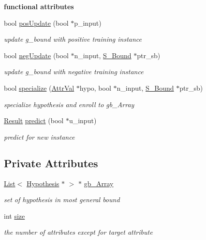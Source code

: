 \begin{Indent}{\bf functional attributes}\par
\begin{DoxyCompactItemize}
\item 
bool \hyperlink{class_g___bound_ad44aeb38feed0ff7e9a2f29f2ada0ac9}{pos\-Update} (bool $\ast$p\-\_\-input)
\begin{DoxyCompactList}\small\item\em update g\-\_\-bound with positive training instance \end{DoxyCompactList}\item 
bool \hyperlink{class_g___bound_a567a0759047141b59389ec0beefb0a6c}{neg\-Update} (bool $\ast$n\-\_\-input, \hyperlink{class_s___bound}{S\-\_\-\-Bound} $\ast$ptr\-\_\-sb)
\begin{DoxyCompactList}\small\item\em update g\-\_\-bound with negative training instance \end{DoxyCompactList}\item 
bool \hyperlink{class_g___bound_acd21b1bb8bd73218d5000bf1fd12872e}{specialize} (\hyperlink{concept_8h_a9680d29b8d997e4adbf99481b65e897d}{Attr\-Val} $\ast$hypo, bool $\ast$n\-\_\-input, \hyperlink{class_s___bound}{S\-\_\-\-Bound} $\ast$ptr\-\_\-sb)
\begin{DoxyCompactList}\small\item\em specialize hypothesis and enroll to gb\-\_\-\-Array \end{DoxyCompactList}\item 
\hyperlink{concept_8h_a28287671eaf7406afd604bd055ba4066}{Result} \hyperlink{class_g___bound_add933c8bb37f279fcbd3dcff4eea3e76}{predict} (bool $\ast$u\-\_\-input)
\begin{DoxyCompactList}\small\item\em predict for new instance \end{DoxyCompactList}\end{DoxyCompactItemize}
\end{Indent}
\subsection*{Private Attributes}
\begin{DoxyCompactItemize}
\item 
\hyperlink{class_list}{List}$<$ \hyperlink{class_hypothesis}{Hypothesis} $\ast$ $>$ $\ast$ \hyperlink{class_g___bound_ac6492431679144fc64b83228f12c0c1a}{gb\-\_\-\-Array}
\begin{DoxyCompactList}\small\item\em set of hypothesis in most general bound \end{DoxyCompactList}\item 
int \hyperlink{class_g___bound_a2583e4243c89d01b3131ce8fb40940a9}{size}
\begin{DoxyCompactList}\small\item\em the number of attributes except for target attribute \end{DoxyCompactList}\end{DoxyCompactItemize}


